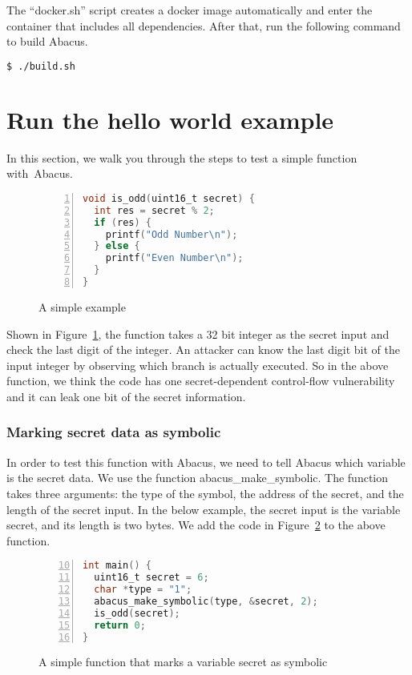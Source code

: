 \documentclass[10pt,conference]{IEEEtran}
\newcommand{\tool}{\textsf{Abacus}}
\begin{document}
The ``docker.sh'' script creates a docker image automatically and enter the container that includes all dependencies. After that, run the following command to build Abacus.

\begin{lstlisting}[language=bash]
$ ./build.sh
\end{lstlisting}
\section{Run the hello world example}
In this section, we walk you through the steps to test a simple function with~\tool{}.

\begin{figure}[h]
\begin{lstlisting}[xleftmargin=.06\textwidth, xrightmargin=.06\textwidth,numbers=left, frame=single, language=C]
void is_odd(uint16_t secret) {
  int res = secret % 2;        
  if (res) {             
    printf("Odd Number\n");
  } else {
    printf("Even Number\n");
  }
}
\end{lstlisting}
\caption{A simple example}
\label{fig:example0}
\end{figure}

Shown in Figure~\ref{fig:example0}, the function takes a 32 bit integer as the secret input and check the last digit of the integer. An attacker can know the last digit bit of the input integer by observing which branch is actually executed. So in the above function, we think the code has one secret-dependent control-flow vulnerability and it can leak one bit of the secret information.

\subsubsection{Marking secret data as symbolic}
In order to test this function with Abacus, we need to tell Abacus which variable is the secret data. We use the function \textsf{abacus\_make\_symbolic}. The function takes three arguments: the type of the symbol, the address of the secret, and the length of the secret input. In the below example, the secret input is the variable secret, and its length is two bytes. We add the code in Figure~\ref{fig:example1} to the above function.

\begin{figure}[h]
\begin{lstlisting}[firstnumber=10, xleftmargin=.06\textwidth, xrightmargin=.06\textwidth,numbers=left, frame=single, language=C]
int main() {
  uint16_t secret = 6;
  char *type = "1";
  abacus_make_symbolic(type, &secret, 2); 
  is_odd(secret);
  return 0;
}
\end{lstlisting}
\caption{A simple function that marks a variable \textsf{secret} as symbolic}
\label{fig:example1}
\end{figure}
\end{document}

